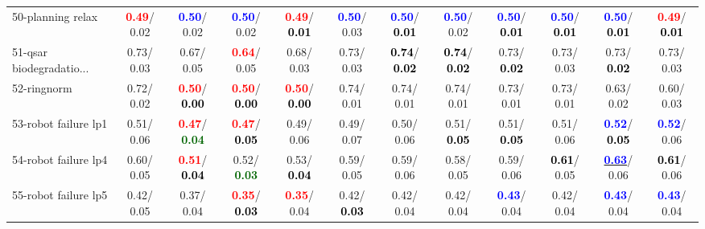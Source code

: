\begin{table}[h]
\begin{center}
{\begin{tabular}{lc|c|c|c|c|c|c|c|c|c|c}
50-planning relax & \textcolor{red}{\textbf{  0.49}}/  0.02 & \textcolor{blue}{\textbf{  0.50}}/  0.02 & \textcolor{blue}{\textbf{  0.50}}/  0.02 & \textcolor{red}{\textbf{  0.49}}/\textcolor{black}{\textbf{  0.01}} & \textcolor{blue}{\textbf{  0.50}}/  0.03 & \textcolor{blue}{\textbf{  0.50}}/\textcolor{black}{\textbf{  0.01}} & \textcolor{blue}{\textbf{  0.50}}/  0.02 & \textcolor{blue}{\textbf{  0.50}}/\textcolor{black}{\textbf{  0.01}} & \textcolor{blue}{\textbf{  0.50}}/\textcolor{black}{\textbf{  0.01}} & \textcolor{blue}{\textbf{  0.50}}/\textcolor{black}{\textbf{  0.01}} & \textcolor{red}{\textbf{  0.49}}/\textcolor{black}{\textbf{  0.01}} \\
51-qsar biodegradatio... &   0.73/  0.03 &   0.67/  0.05 & \textcolor{red}{\textbf{  0.64}}/  0.05 &   0.68/  0.03 &   0.73/  0.03 & \textcolor{black}{\textbf{  0.74}}/\textcolor{black}{\textbf{  0.02}} & \textcolor{black}{\textbf{  0.74}}/\textcolor{black}{\textbf{  0.02}} &   0.73/\textcolor{black}{\textbf{  0.02}} &   0.73/  0.03 &   0.73/\textcolor{black}{\textbf{  0.02}} &   0.73/  0.03 \\
52-ringnorm &   0.72/  0.02 & \textcolor{red}{\textbf{  0.50}}/\textcolor{black}{\textbf{  0.00}} & \textcolor{red}{\textbf{  0.50}}/\textcolor{black}{\textbf{  0.00}} & \textcolor{red}{\textbf{  0.50}}/\textcolor{black}{\textbf{  0.00}} &   0.74/  0.01 &   0.74/  0.01 &   0.74/  0.01 &   0.73/  0.01 &   0.73/  0.01 &   0.63/  0.02 &   0.60/  0.03 \\
53-robot failure lp1 &   0.51/  0.06 & \textcolor{red}{\textbf{  0.47}}/\textcolor{darkgreen}{\textbf{  0.04}} & \textcolor{red}{\textbf{  0.47}}/\textcolor{black}{\textbf{  0.05}} &   0.49/  0.06 &   0.49/  0.07 &   0.50/  0.06 &   0.51/\textcolor{black}{\textbf{  0.05}} &   0.51/\textcolor{black}{\textbf{  0.05}} &   0.51/  0.06 & \textcolor{blue}{\textbf{  0.52}}/\textcolor{black}{\textbf{  0.05}} & \textcolor{blue}{\textbf{  0.52}}/  0.06 \\ \hline
54-robot failure lp4 &   0.60/  0.05 & \textcolor{red}{\textbf{  0.51}}/\textcolor{black}{\textbf{  0.04}} &   0.52/\textcolor{darkgreen}{\textbf{  0.03}} &   0.53/\textcolor{black}{\textbf{  0.04}} &   0.59/  0.05 &   0.59/  0.06 &   0.58/  0.05 &   0.59/  0.06 & \textcolor{black}{\textbf{  0.61}}/  0.05 & \underline{\textcolor{blue}{\textbf{  0.63}}}/  0.06 & \textcolor{black}{\textbf{  0.61}}/  0.06 \\
55-robot failure lp5 &   0.42/  0.05 &   0.37/  0.04 & \textcolor{red}{\textbf{  0.35}}/\textcolor{black}{\textbf{  0.03}} & \textcolor{red}{\textbf{  0.35}}/  0.04 &   0.42/\textcolor{black}{\textbf{  0.03}} &   0.42/  0.04 &   0.42/  0.04 & \textcolor{blue}{\textbf{  0.43}}/  0.04 &   0.42/  0.04 & \textcolor{blue}{\textbf{  0.43}}/  0.04 & \textcolor{blue}{\textbf{  0.43}}/  0.04 \\

\end{tabular}}
\end{center}
\end{table}
